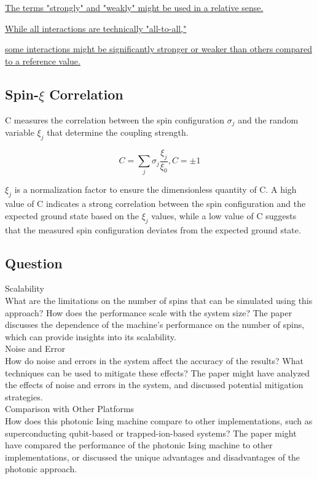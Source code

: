 \underline{The terms "strongly" and "weakly" might be used in a relative sense.} 

\underline{While all interactions are technically "all-to-all,"}

\underline{some interactions might be significantly stronger or weaker than others compared to a reference value.}

\subsection{Spin-$\xi$ Correlation}
C measures the correlation between the spin configuration $\sigma_j$ and the random variable $\xi_j$ that determine the coupling strength. 


\begin{equation}
C = \sum_j {\sigma_j \frac{\xi_j}{\xi_0}}, C = \pm 1
\end{equation}

$\xi_j$ is a normalization factor to ensure the dimensionless quantity of C. A high value of C indicates a strong correlation between the spin configuration and the expected ground state based on the $\xi_j$ values, while a low value of C suggests that the measured spin configuration deviates from the expected ground state.

\subsection{Question}
Scalability\\
What are the limitations on the number of spins that can be simulated using this approach? How does the performance scale with the system size? The paper discusses the dependence of the machine's performance on the number of spins, which can provide insights into its scalability.\\

Noise and Error\\
How do noise and errors in the system affect the accuracy of the results? What techniques can be used to mitigate these effects? The paper might have analyzed the effects of noise and errors in the system, and discussed potential mitigation strategies.\\

Comparison with Other Platforms\\
How does this photonic Ising machine compare to other implementations, such as superconducting qubit-based or trapped-ion-based systems? The paper might have compared the performance of the photonic Ising machine to other implementations, or discussed the unique advantages and disadvantages of the photonic approach.\\

